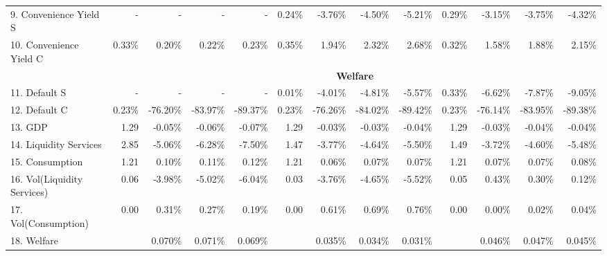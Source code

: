 \documentclass[letterpaper,12pt,dvipsnames,usenames]{article}
\theoremstyle{plain}
\begin{document}
{\begin{landscape}
\begin{table}
{\begin{tabular}{l|rrrr|rrrr|rrrr}
				9. Convenience Yield S & - & - & - & -   &  0.24\% & -3.76\% & -4.50\% &  -5.21\% &  0.29\% & -3.15\% & -3.75\% &  -4.32\%\\
				10. Convenience Yield C & 0.33\% & 0.20\% & 0.22\% &  0.23\% &  0.35\% & 1.94\% & 2.32\% & 2.68\% &  0.32\% & 1.58\% & 1.88\% & 2.15\% \\ \midrule 
				& \multicolumn{12}{c}{\textbf{Welfare}}            \\  \midrule 
				11. Default S &  - & - & - & -  &  0.01\% & -4.01\% & -4.81\% &  -5.57\% & 0.33\% & -6.62\% & -7.87\% &  -9.05\%\\  
				12. Default C &  0.23\% & -76.20\% & -83.97\% &  -89.37\% &  0.23\% & -76.26\% & -84.02\% & -89.42\% &  0.23\% & -76.14\% & -83.95\% & -89.38\% \\ 
				13. GDP &  1.29 & -0.05\% & -0.06\% &  -0.07\% &  1.29 & -0.03\% & -0.03\% & -0.04\% &  1.29 & -0.03\% & -0.04\% & -0.04\% \\
				14. Liquidity Services &  2.85 & -5.06\% & -6.28\% &  -7.50\% &  1.47 & -3.77\% & -4.64\% & -5.50\% &  1.49 & -3.72\% & -4.60\% & -5.48\% \\
				15. Consumption & 1.21 & 0.10\% & 0.11\% &  0.12\% &  1.21 & 0.06\% & 0.07\% & 0.07\% &  1.21 & 0.07\% & 0.07\% & 0.08\% \\  
				16. Vol(Liquidity Services) &  0.06 & -3.98\% & -5.02\% &  -6.04\% &  0.03 & -3.76\% & -4.65\% & -5.52\% &  0.05 & 0.43\% & 0.30\% & 0.12\% \\
				17. Vol(Consumption) & 0.00 & 0.31\% & 0.27\% &  0.19\% &  0.00 & 0.61\% & 0.69\% & 0.76\% &  0.00 & 0.00\% & 0.02\% & 0.04\%  \\
				18. Welfare & & 0.070\% & 0.071\% &  0.069\% &   & 0.035\% & 0.034\% & 0.031\% &   & 0.046\% & 0.047\% & 0.045\%  \\
				\bottomrule
			\end{tabular}%
		\label{tab:simplemodels}
}	
		\end{table}
	\end{landscape}
}

\clearpage 
\newpage
\end{document}
